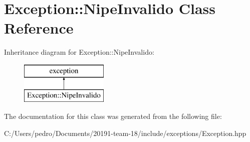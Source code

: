 \hypertarget{class_exception_1_1_nipe_invalido}{}\section{Exception\+::Nipe\+Invalido Class Reference}
\label{class_exception_1_1_nipe_invalido}
Inheritance diagram for Exception\+::Nipe\+Invalido\+:\begin{figure}[H]
\begin{center}
\leavevmode
\includegraphics[height=2.000000cm]{class_exception_1_1_nipe_invalido}
\end{center}
\end{figure}


The documentation for this class was generated from the following file\+:\begin{DoxyCompactItemize}
\item 
C\+:/\+Users/pedro/\+Documents/20191-\/team-\/18/include/exceptions/Exception.\+hpp\end{DoxyCompactItemize}
